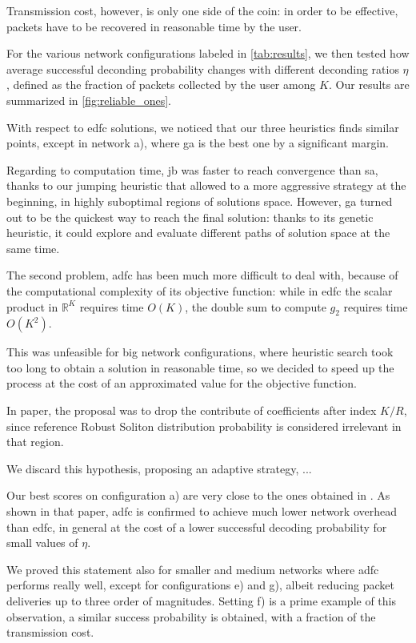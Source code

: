 \documentclass[12pt,journal,draftclsnofoot,onecolumn]{IEEEtran}
\begin{document}
Transmission cost, however, is only one side of the coin: in order to be effective, packets have to be recovered in reasonable time by the user.

For the various network configurations labeled in \autoref{tab:results}, we then tested how average successful deconding probability changes with different deconding ratios $\eta$, defined as the fraction of packets collected by the user among $K$.
Our results are summarized in \autoref{fig:reliable_ones}.

\bigbreak
With respect to \gls{edfc} solutions, we noticed that our three heuristics finds similar points, except in network a), where \gls{ga} is the best one by a significant margin.

Regarding to computation time, \gls{jb} was faster to reach convergence than \gls{sa}, thanks to our jumping heuristic that allowed to a more aggressive strategy at the beginning, in highly suboptimal regions of solutions space.
However, \gls{ga} turned out to be the quickest way to reach the final solution: thanks to its genetic heuristic, it could explore and evaluate different paths of solution space at the same time. %

The second problem, \gls{adfc} has been much more difficult to deal with, because of the computational complexity of its objective function: while in \gls{edfc} the scalar product in $\mathbb{R}^K$ requires time $O(K)$, the double sum to compute $g_2$ requires time $O(K^2)$.

This was unfeasible for big network configurations, where heuristic search took too long to obtain a solution in reasonable time, so we decided to speed up the process at the cost of an approximated value for the objective function.

In paper\cite{Lin2007}, the proposal was to drop the contribute of coefficients after index $K/R$, since reference Robust Soliton distribution probability is considered irrelevant in that region.

We discard this hypothesis, proposing an adaptive strategy, ...

Our best scores on configuration a) are very close to the ones obtained in \cite{Lin2007}.
As shown in that paper, \gls{adfc} is confirmed to achieve much lower network overhead than \gls{edfc}, in general at the cost of a lower successful decoding probability for small values of $\eta$.

We proved this statement also for smaller and medium networks where \gls{adfc} performs really well, except for configurations e) and g), albeit reducing packet deliveries up to three order of magnitudes.
Setting f) is a prime example of this observation, a similar success probability is obtained, with a fraction of the transmission cost.
\end{document}
